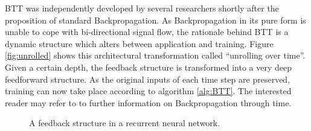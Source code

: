 \documentclass[10pt,a4paper,DIV=11]{scrreprt}
\begin{document}
BTT was independently developed by several researchers shortly after the proposition of standard Backpropagation.\cite{BTT1}\cite{BTT2}\cite{BTT3}
As Backpropagation in its pure form is unable to cope with bi-directional signal flow, the rationale behind BTT is a dynamic structure which alters
between application and training. Figure \ref{fig:unrolled} shows this architectural transformation called “unrolling over time”. Given a certain 
depth, the feedback structure is transformed into a very deep feedforward structure. As the original inputs of each time step are preserved,
training can now take place according to algorithm \ref{alg:BTT}. The interested reader may refer to \cite{DEEPLEARNING} to further information on
Backpropagation through time.

\begin{figure}[H]

\centering
\caption{A feedback structure in a recurrent neural network.}
\label{fig:feedback}
\end{figure}
\end{document}
